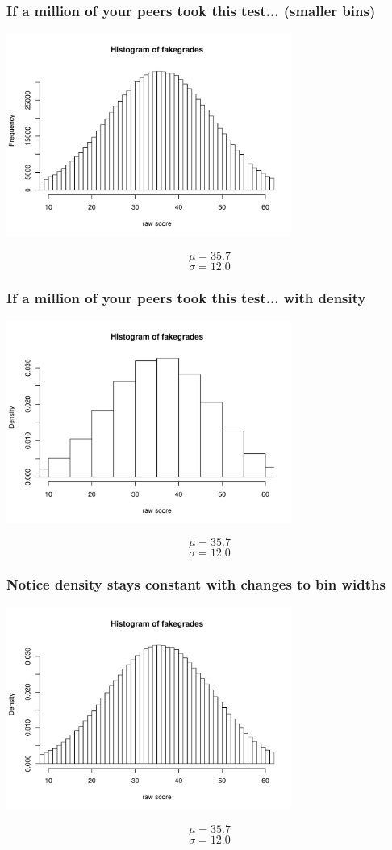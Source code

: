\begin{frame}
\begin{center}
\frametitle{If a million of your peers took this test... (smaller bins)}
\includegraphics[width=0.7\textwidth]{3-1_normal_distribution/figures/grades/fakegrades2.pdf}
\end{center}
$$\mu = 35.7$$
$$\sigma=12.0$$
\end{frame}

\begin{frame}
\begin{center}
\frametitle{If a million of your peers took this test... with density}
\includegraphics[width=0.7\textwidth]{3-1_normal_distribution/figures/grades/fakegrades3.pdf}
\end{center}
$$\mu = 35.7$$
$$\sigma=12.0$$
\end{frame}

\begin{frame}
\begin{center}
\frametitle{Notice density stays constant with changes to bin widths}
\includegraphics[width=0.7\textwidth]{3-1_normal_distribution/figures/grades/fakegrades4.pdf}
\end{center}
$$\mu = 35.7$$
$$\sigma=12.0$$
\end{frame}

